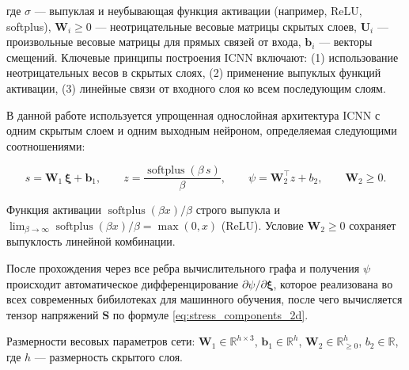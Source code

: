 где $\sigma$ — выпуклая и неубывающая функция активации (например, ReLU, softplus), $\mathbf{W}_i \geq 0$ — неотрицательные весовые матрицы скрытых слоев, $\mathbf{U}_i$ — произвольные весовые матрицы для прямых связей от входа, $\mathbf{b}_i$ — векторы смещений. Ключевые принципы построения ICNN включают: (1) использование неотрицательных весов в скрытых слоях, (2) применение выпуклых функций активации, (3) линейные связи от входного слоя ко всем последующим слоям.

В данной работе используется упрощенная однослойная архитектура ICNN с одним скрытым слоем и одним выходным нейроном, 
определяемая следующими соотношениями:

\begin{equation}
  s = \mathbf{W}_1 \,\boldsymbol{\xi} + \mathbf{b}_1,\qquad
  z=\frac{\operatorname{softplus}(\beta\, s)}{\beta},\qquad
  \psi = \mathbf{W}_2^{\top} z + b_2,\qquad \mathbf{W}_2 \ge 0.
  \label{eq:icnn_architecture}
\end{equation}

Функция активации $\operatorname{softplus}(\beta x)/\beta$ строго выпукла и
$\lim_{\beta\to\infty}\operatorname{softplus}(\beta x)/\beta=\max(0,x)$ (ReLU). Условие $\mathbf{W}_2\ge 0$ 
сохраняет выпуклость линейной комбинации. 

После прохождения через все ребра вычислительного графа 
и получения $\psi$ происходит автоматическое дифференцирование $\partial\psi/\partial\boldsymbol{\xi}$, 
которое реализована во всех современных бибилотеках для машинного обучения,
после чего вычисляется тензор напряжений $\mathbf{S}$ по формуле \eqref{eq:stress_components_2d}.

Размерности весовых параметров сети: $\mathbf{W}_1 \in \mathbb{R}^{h \times 3}$, $\mathbf{b}_1 \in \mathbb{R}^{h}$,
 $\mathbf{W}_2 \in \mathbb{R}^{h}_{\geq 0}$, $b_2 \in \mathbb{R}$, где $h$ — размерность скрытого слоя.





